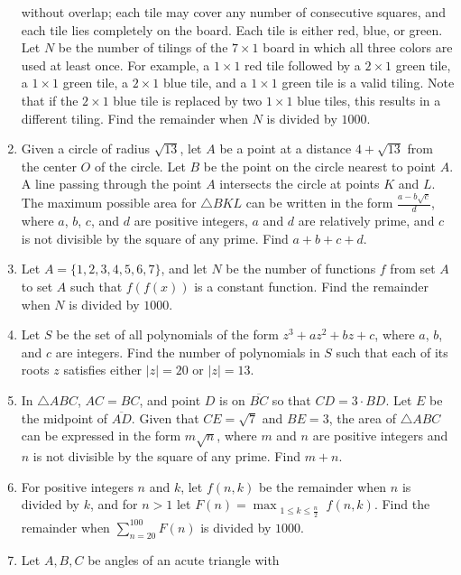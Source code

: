 \documentclass{article}
\begin{document}
\begin{enumerate}[label=\arabic*., itemsep=0.5em]
without overlap; each tile may cover any number of consecutive squares, and each tile lies completely on the board. Each tile is either red, blue, or green. Let $N$ be the number of tilings of the $7\times 1$ board in which all three colors are used at least once. For example, a $1\times 1$ red tile followed by a $2\times 1$ green tile, a $1\times 1$ green tile, a $2\times 1$ blue tile, and a $1\times 1$ green tile is a valid tiling. Note that if the $2\times 1$ blue tile is replaced by two $1\times 1$ blue tiles, this results in a different tiling. Find the remainder when $N$ is divided by $1000$.\par \vspace{0.5em}\item Given a circle of radius $\sqrt{13}$, let $A$ be a point at a distance $4 + \sqrt{13}$ from the center $O$ of the circle. Let $B$ be the point on the circle nearest to point $A$. A line passing through the point $A$ intersects the circle at points $K$ and $L$. The maximum possible area for $\triangle BKL$ can be written in the form $\frac{a - b\sqrt{c}}{d}$, where $a$, $b$, $c$, and $d$ are positive integers, $a$ and $d$ are relatively prime, and $c$ is not divisible by the square of any prime. Find $a+b+c+d$.\par \vspace{0.5em}\item Let $A = \{1, 2, 3, 4, 5, 6, 7\}$, and let $N$ be the number of functions $f$ from set $A$ to set $A$ such that $f(f(x))$ is a constant function. Find the remainder when $N$ is divided by $1000$.\par \vspace{0.5em}\item Let $S$ be the set of all polynomials of the form $z^3 + az^2 + bz + c$, where $a$, $b$, and $c$ are integers. Find the number of polynomials in $S$ such that each of its roots $z$ satisfies either $|z| = 20$ or $|z| = 13$.\par \vspace{0.5em}\item In $\triangle ABC$, $AC = BC$, and point $D$ is on $\overline{BC}$ so that $CD = 3\cdot BD$. Let $E$ be the midpoint of $\overline{AD}$. Given that $CE = \sqrt{7}$ and $BE = 3$, the area of $\triangle ABC$ can be expressed in the form $m\sqrt{n}$, where $m$ and $n$ are positive integers and $n$ is not divisible by the square of any prime. Find $m+n$.\par \vspace{0.5em}\item For positive integers $n$ and $k$, let $f(n, k)$ be the remainder when $n$ is divided by $k$, and for $n > 1$ let $F(n) = \max_{\substack{1\le k\le \frac{n}{2}}} f(n, k)$. Find the remainder when $\sum\limits_{n=20}^{100} F(n)$ is divided by $1000$.\par \vspace{0.5em}\item Let $A,B,C$ be angles of an acute triangle with


\end{enumerate}
\end{document}
